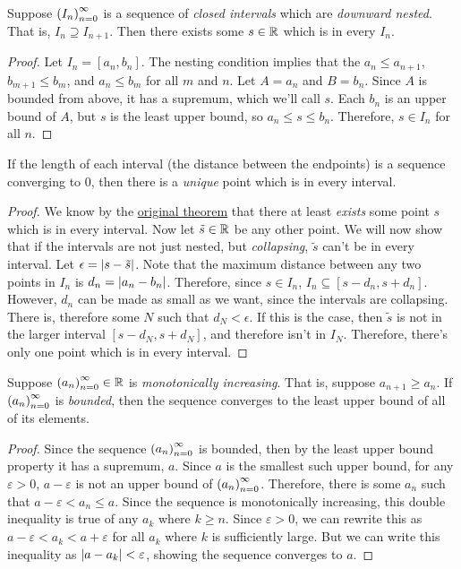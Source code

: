 \begin{theorem}
Suppose $\seq{I}$ is a sequence of \emph{closed intervals} which are \emph{downward nested}. That is, $I_n \supseteq I_{n+1}$. Then there exists some $s \in \mathbb{R}$ which is in every $I_n$.
\end{theorem}
\begin{proof}
Let $I_n = [a_n,b_n]$. The nesting condition implies that the $a_n \leq a_{n+1}$, $b_{m+1} \leq b_m$, and $a_n \leq b_m$ for all $m$ and $n$. Let $A = {a_n}$ and $B = {b_n}$. Since $A$ is bounded from above, it has a supremum, which we'll call $s$. Each $b_n$ is an upper bound of $A$, but $s$ is the least upper bound, so $a_n \leq s \leq b_n$. Therefore, $s \in I_n$ for all $n$.
\end{proof}
\begin{corollary}
If the length of each interval (the distance between the endpoints) is a sequence converging to $0$, then there is a \emph{unique} point which is in every interval.
\end{corollary}
\begin{proof}
We know by the \hyperlink{Nested Intervals Theorem}{original theorem} that there at least \emph{exists} some point $s$  which is in every interval. Now let $\tilde{s} \in \mathbb{R}$ be any other point. We will now show that if the intervals are not just nested, but \emph{collapsing}, $\tilde{s}$ can't be in every interval. Let $\epsilon = \left\lvert s-\tilde{s} \right\rvert$. Note that the maximum distance between any two points in $I_n$ is $d_n = \left\lvert a_n-b_n \right\rvert$. Therefore, since $s \in I_n$, $I_n \subseteq [s-d_n,s+d_n]$. However, $d_n$ can be made as small as we want, since the intervals are collapsing. There is, therefore some $N$ such that $d_N < \epsilon$. If this is the case, then $\tilde{s}$ is not in the larger interval $[s-d_N,s+d_N]$, and therefore isn't in $I_N$. Therefore, there's only one point which is in every interval.
\end{proof}
\begin{theorem}
Suppose $\seq{a} \in \R$ is \emph{monotonically increasing}. That is, suppose $a_{n+1} \geq a_n$. If $\seq{a}$ is \emph{bounded}, then the sequence converges to the least upper bound of all of its elements.
\end{theorem}
\begin{proof}
Since the sequence $\seq{a}$ is bounded, then by the least upper bound property it has a supremum, $a$. Since $a$ is the smallest such upper bound, for any $\varepsilon > 0$, $a-\varepsilon$ is not an upper bound of $\seq{a}$. Therefore, there is some $a_n$ such that $a-\varepsilon < a_n \leq a$. Since the sequence is monotonically increasing, this double inequality is true of any $a_k$ where $k \geq n$. Since $\varepsilon > 0$, we can rewrite this as $a-\varepsilon < a_k < a+\varepsilon$ for all $a_k$ where $k$ is sufficiently large. But we can write this inequality as $\left\lvert a-a_k \right\rvert < \varepsilon$, showing the sequence converges to $a$.
\end{proof}
